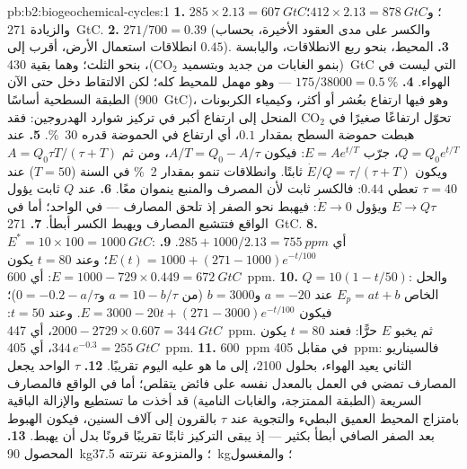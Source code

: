 \begin{solution}{pb:b2:biogeochemical-cycles:1}
\textbf{1.} $285\times 2.13 = \qty{607}{GtC}$؛ و$412\times 2.13 =
\qty{878}{GtC}$؛ والزيادة \qty{271}{GtC}.
\textbf{2.} $271/700 = 0.39$ (والكسر على مدى العقود الأخيرة،
بحساب انطلاقات استعمال الأرض، أقرب إلى $0.45$).
\textbf{3.} المحيط، بنحو ربع الانطلاقات، واليابسة
(بنمو الغابات من جديد وبتسميد $\mathrm{CO_2}$)، بنحو الثلث؛ وهما
بقية \qty{430}{GtC} التي ليست في الهواء.
\textbf{4.} $175/38000 = \qty{0.5}{\%}$ --- وهو مهمل للمحيط
كله؛ لكن الالتقاط دخل حتى الآن الطبقة السطحية أساسًا
(\qty{900}{GtC})، وهو فيها ارتفاع بعُشر أو أكثر، وكيمياء
الكربونات تحوّل ارتفاعًا صغيرًا في $\mathrm{CO_2}$ المنحل إلى
ارتفاع أكبر في تركيز شوارد الهدروجين: فقد هبطت حموضة السطح
بمقدار $0.1$، أي ارتفاع في الحموضة قدره \qty{30}{\%}.
\textbf{5.} عند $Q = Q_0 e^{t/T}$، جرّب $E = Ae^{t/T}$: فيكون $A/T = Q_0 -
A/\tau$، ومن ثم $A = Q_0\tau T/(\tau + T)$ ويكون 
$\dot E/Q = \tau/(\tau + T)$ ثابتًا. وانطلاقات تنمو بمقدار
\qty{2}{\%} في السنة ($T = 50$) عند $\tau = 40$ تعطي $0.44$: فالكسر
ثابت لأن المصرف والمنبع ينموان معًا.
\textbf{6.} عند $Q$ ثابت يؤول $E \to Q\tau$ ويؤول $\dot E \to 0$: فيهبط
 نحو الصفر إذ تلحق المصارف --- في
 الواحد؛ أما في الواقع فتتشبع المصارف ويهبط الكسر
أبطأ.
\textbf{7.} \qty{271}{GtC}.
\textbf{8.} $E^{*} = 10\times 100 = \qty{1000}{GtC}$: أي $285 +
1000/2.13 = \qty{755}{ppm}$.
\textbf{9.} $E(t) = 1000 + (271 - 1000)e^{-t/100}$؛ وعند $t = 80$ يكون
$E = 1000 - 729\times 0.449 = \qty{672}{GtC}$: أي \qty{600}{ppm}.
\textbf{10.} $Q = 10(1 - t/50)$: والحل الخاص $E_p = at + b$
عند $a = -20$ و$b = 3000$ (من $a = 10 - b/\tau$ و$0 = -0.2 -
a/\tau$)؛ فيكون $E = 3000 - 20t + (271 - 3000)e^{-t/100}$. وعند $t = 50$:
$2000 - 2729\times 0.607 = \qty{344}{GtC}$، أي \qty{447}{ppm}. ثم يخبو $E$
حرًّا: فعند $t = 80$ يكون $344\,e^{-0.3} = \qty{255}{GtC}$، أي
\qty{405}{ppm}.
\textbf{11.} \qty{600}{ppm} في مقابل \qty{405}{ppm}: فالسيناريو الثاني
يعيد الهواء، بحلول 2100، إلى ما هو عليه اليوم تقريبًا.
\textbf{12.} $\tau$ الواحد يجعل المصارف تمضي في العمل بالمعدل
نفسه على فائض يتقلص؛ أما في الواقع فالمصارف السريعة (الطبقة
الممتزجة، والغابات النامية) قد أخذت ما تستطيع
والإزالة الباقية بامتزاج المحيط العميق البطيء
والتجوية عند $\tau$ بالقرون إلى آلاف السنين، فيكون الهبوط
بعد الصفر الصافي أبطأ بكثير --- إذ يبقى التركيز ثابتًا
تقريبًا قرونًا بدل أن يهبط.
\textbf{13.} المحصول \qty{90}{kg}؛ والمنزوعة نترتته \qty{37.5}{kg}؛ والمغسول

\end{solution}
